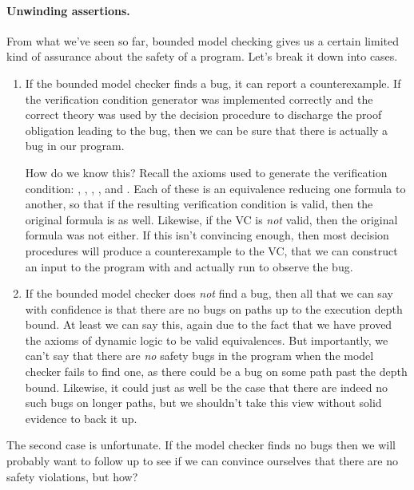 \documentclass[11pt,twoside]{scrartcl}
\begin{document}
\paragraph{Unwinding assertions.} From what we've seen so far, bounded model checking gives us a certain limited kind of assurance about the safety of a program. Let's break it down into cases.
\begin{enumerate}
\item If the bounded model checker finds a bug, it can report a counterexample. If the verification condition generator was implemented correctly and the correct theory was used by the decision procedure to discharge the proof obligation leading to the bug, then we can be sure that there is actually a bug in our program. 

How do we know this? Recall the axioms used to generate the verification condition: , , , , and . Each of these is an equivalence reducing one formula to another, so that if the resulting verification condition is valid, then the original formula is as well. Likewise, if the VC is \emph{not} valid, then the original formula was not either. If this isn't convincing enough, then most decision procedures will produce a counterexample to the VC, that we can construct an input to the program with and actually run to observe the bug.

\item If the bounded model checker does \emph{not} find a bug, then all that we can say with confidence is that there are no bugs on paths up to the execution depth bound. At least we can say this, again due to the fact that we have proved the axioms of dynamic logic to be valid equivalences. But importantly, we can't say that there are \emph{no} safety bugs in the program when the model checker fails to find one, as there could be a bug on some path past the depth bound. Likewise, it could just as well be the case that there are indeed no such bugs on longer paths, but we shouldn't take this view without solid evidence to back it up.
\end{enumerate}
The second case is unfortunate. If the model checker finds no bugs then we will probably want to follow up to see if we can convince ourselves that there are no safety violations, but how?
\end{document}

